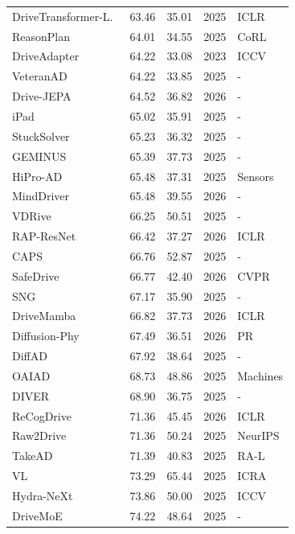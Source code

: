 \documentclass[10pt,twocolumn,letterpaper]{article}
\begin{document}
\begin{table}[t]
\begin{tabular}{l|ll|ll}
DriveTransformer-L.~\cite{Jia2025ICLR} & 63.46 & 35.01 & 2025 & ICLR \\
ReasonPlan~\cite{Liu2025CoRL} & 64.01 & 34.55 & 2025 & CoRL \\
DriveAdapter~\cite{Jia2023ICCV} & 64.22 & 33.08 & 2023 & ICCV \\
VeteranAD~\cite{Zhang2025ARXIVb} & 64.22 & 33.85 & 2025 & - \\
Drive-JEPA~\cite{Wang2026ARXIV} & 64.52 & 36.82 & 2026 & - \\
iPad~\cite{Guo2025ARXIVb} & 65.02 & 35.91 & 2025 & - \\
StuckSolver~\cite{Bao2025ARXIV} & 65.23 & 36.32 & 2025 & - \\
GEMINUS~\cite{Wan2025ARXIV} & 65.39 & 37.73 & 2025 & - \\
HiPro-AD~\cite{Chen2025SENSORS} & 65.48 & 37.31 & 2025 & Sensors \\
MindDriver~\cite{Zhang2026ARXIV} & 65.48 & 39.55 & 2026 & - \\
VDRive~\cite{Guo2025ARXIV} & 66.25 & 50.51 & 2025 & - \\
RAP-ResNet~\cite{Feng2026ICLR} & 66.42 & 37.27 & 2026 & ICLR \\
CAPS~\cite{Mirkhani2025ARXIV} & 66.76 & 52.87 & 2025 & - \\
SafeDrive~\cite{Kim2026CVPR} & 66.77 & 42.40 & 2026 & CVPR \\
SNG~\cite{Hua2025Online} & 67.17 & 35.90 & 2025 & - \\
DriveMamba~\cite{Su2026ICLR} & 66.82 & 37.73 & 2026 & ICLR \\
Diffusion-Phy~\cite{Hu2026PR} & 67.49 & 36.51 & 2026 & PR \\
DiffAD~\cite{Wang2025ARXIVb} & 67.92 & 38.64 & 2025 & - \\
OAIAD~\cite{Yin2025Machines} & 68.73 & 48.86 & 2025 & Machines \\
DIVER~\cite{Song2025ARXIV} & 68.90 & 36.75 & 2025 & - \\ 
ReCogDrive~\cite{Li2026ICLR} & 71.36 & 45.45 & 2026 & ICLR \\
Raw2Drive~\cite{Yang2025NEURIPS} & 71.36 & 50.24 & 2025 & NeurIPS \\
TakeAD~\cite{Liu2025RAL} & 71.39 & 40.83 & 2025 & RA-L \\
VL~\cite{Arasteh2025ICRA} & 73.29 & 65.44 & 2025 & ICRA \\
Hydra-NeXt~\cite{Li2025ICCVb} & 73.86 & 50.00 & 2025 & ICCV \\
DriveMoE~\cite{Yang2025ARXIV} & 74.22 & 48.64 & 2025 & - \\

\end{tabular}
\end{table}
\end{document}
